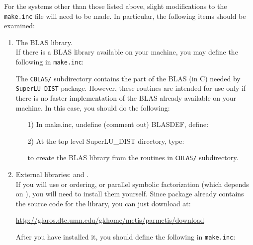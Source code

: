 For the systems other than those listed above, slight modifications to the
{\tt make.inc} file will need to be made.
In particular, the following items should be examined:
\begin{enumerate}   
\item The BLAS library.\\
   If there is a BLAS library available on your machine,
   you may define the following in {\tt make.inc}:

   \hspace{.4in}{\tt BLASDEF = -DUSE\_VENDOR\_BLAS}

   \vspace{-6pt}
   \hspace{.4in}{\tt BLASLIB = <BLAS library you wish to link with>}

   The {\tt CBLAS/} subdirectory contains the part of the BLAS (in C) needed by
   {\tt SuperLU\_DIST} package. However, these routines are intended for use
   only if there is no faster implementation of the BLAS already available
   on your machine. In this case, you should do the following:
   \begin{itemize}
   \item[1)]In make.inc, undefine (comment out) BLASDEF, define:

          \hspace{.4in}{\tt BLASLIB = ../lib/libblas\$(PLAT).a}

   \item[2)] At the top level SuperLU\_DIST directory, type:

          \hspace{.4in}{\tt make blaslib}

         to create the BLAS library from the routines in {\tt CBLAS/}
	 subdirectory.
   \end{itemize}

\item External libraries: {\metis} and {\parmetis}. \\
   If you will use {\metis} or {\parmetis} ordering, or parallel
   symbolic factorization (which depends on {\parmetis}), you will
   need to install them yourself. Since {\parmetis} package already
   contains the source code for the {\metis} library, you can just
   download {\parmetis} at:

   \hspace{.4in}\url{http://glaros.dtc.umn.edu/gkhome/metis/parmetis/download}

   After you have installed it, you should define the following in
   {\tt make.inc}:


\end{enumerate}
